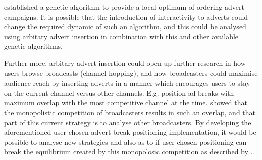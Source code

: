 	\citet{fleming2007optimal} established a genetic algorithm to provide a local optimum of ordering advert campaigns. It is possible that the introduction of interactivity to adverts could change the required dynamic of such an algorithm, and this could be analysed using arbitary advert insertion in combination with this and other available genetic algorithms.

	Further more, arbitary advert insertion could open up further research in how users browse broadcasts (channel hopping), and how broadcasters could maximise audience reach by inserting adverts in a manner which encourages users to stay on the current channel versus other channels. E.g. position ad breaks with maximum overlap with the most competitive channel at the time. \citet{epstein1998network} showed that the monopolistic competition of broadcasters results in such an overlap, and that part of this current strategy is to analyse other broadcasters. By developing the aforementioned user-chosen advert break positioning implementation, it would be possible to analyse new strategies and also as to if user-chosen positioning can break the equilibrium created by this monopolosic competition as described by \citeauthor{epstein1998network}.




